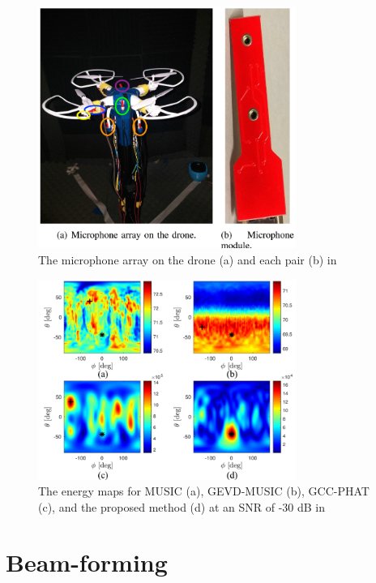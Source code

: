 \documentclass[notitlepage]{report}
\begin{document}
\begin{figure}[H]
\includegraphics[width=0.75\textwidth]{./manamperi_2022/array.png}
\centering
\caption{The microphone array on the drone (a) and each pair (b) in \cite{manamperi_drone_2022}}
\label{fig:manamperi_2022_array}
\centering
\end{figure}

\begin{figure}[H]
\includegraphics[width=0.75\textwidth]{./manamperi_2022/map_n30.png}
\centering
\caption{The energy maps for MUSIC (a), GEVD-MUSIC (b), GCC-PHAT (c), and the proposed method (d) at an SNR of -30 \si{dB} in \cite{manamperi_drone_2022}}
\label{fig:manamperi_2022_map_n30}
\centering
\end{figure}

\section{Beam-forming}
\end{document}
